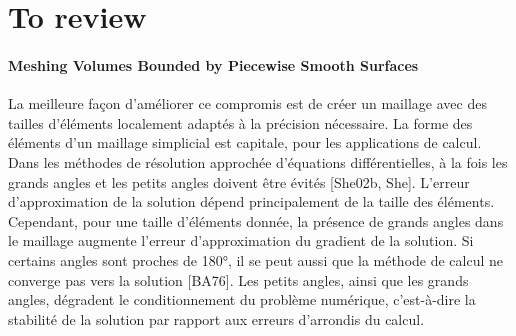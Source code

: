 \newpage


\section{To review}

\paragraph{Meshing Volumes Bounded by Piecewise Smooth Surfaces~\cite{LRineau2007}}{

La meilleure façon d'améliorer ce compromis est de créer un maillage avec des tailles d'éléments localement adaptés à la précision nécessaire. La forme des éléments d'un maillage simplicial est capitale, pour les applications de calcul. Dans les méthodes de résolution approchée d'équations différentielles, à la fois les grands angles et les petits angles doivent être évités [She02b, She]. L'erreur d'approximation de la solution dépend principalement de la taille des éléments. Cependant, pour une taille d'éléments donnée, la présence de grands angles dans le maillage augmente l'erreur d'approximation du gradient de la solution. Si certains angles sont proches de 180°, il se peut aussi que la méthode de calcul ne converge pas vers la solution [BA76]. Les petits angles, ainsi que les grands angles, dégradent le conditionnement du problème numérique, c'est-à-dire la stabilité de la solution par rapport aux erreurs d'arrondis du calcul. 


}



